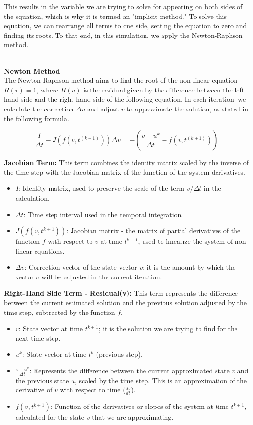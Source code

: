 \documentclass[runningheads]{llncs}
\begin{document}
This results in the variable we are trying to solve for appearing on both sides of the equation, which is why it is termed an "implicit method." To solve this equation, we can rearrange all terms to one side, setting the equation to zero and finding its roots. To that end, in this simulation, we apply the Newton-Raphson method.

\textbf{\\Newton Method\\}
The Newton-Raphson method aims to find the root of the non-linear equation \( R(v) = 0 \), where \( R(v) \) is the residual given by the difference between the left-hand side and the right-hand side of the following equation. In each iteration, we calculate the correction \( \Delta v \) and adjust \( v \) to approximate the solution, as stated in the following formula.

\begin{equation}
\frac{I}{\Delta t} - J(f(v,t^{(k+1)})) \Delta v = -\left(\frac{v - u^k}{\Delta t} - f(v, t^{(k+1)})\right)
\end{equation}

\textbf{Jacobian Term:}
This term combines the identity matrix scaled by the inverse of the time step with the Jacobian matrix of the function of the system derivatives.
\begin{itemize}
    \item \( I \): Identity matrix, used to preserve the scale of the term \( v/\Delta t \) in the calculation.
    \item \( \Delta t \): Time step interval used in the temporal integration.
    \item \( J(f(v, t^{k+1})) \): Jacobian matrix - the matrix of partial derivatives of the function \( f \) with respect to \( v \) at time \( t^{k+1} \), used to linearize the system of non-linear equations.
    \item \( \Delta v \): Correction vector of the state vector \( v \); it is the amount by which the vector \( v \) will be adjusted in the current iteration.
\end{itemize}

\textbf{Right-Hand Side Term - Residual(v):}
This term represents the difference between the current estimated solution and the previous solution adjusted by the time step, subtracted by the function \( f \).
\begin{itemize}
    \item \( v \): State vector at time \( t^{k+1} \); it is the solution we are trying to find for the next time step.
    \item \( u^k \): State vector at time \( t^k \) (previous step).
    \item \( \frac{v - u^k}{\Delta t} \): Represents the difference between the current approximated state \( v \) and the previous state \( u \), scaled by the time step. This is an approximation of the derivative of \( v \) with respect to time (\( \frac{dv}{dt} \)).
    \item \( f(v, t^{k+1}) \): Function of the derivatives or slopes of the system at time \( t^{k+1} \), calculated for the state \( v \) that we are approximating.
\end{itemize}
\end{document}
